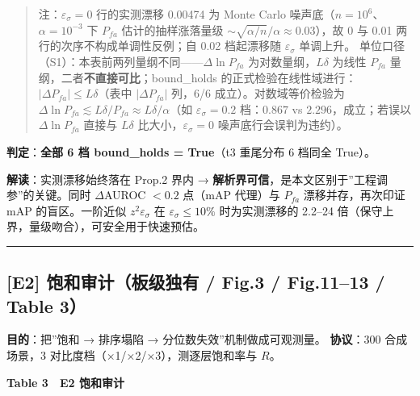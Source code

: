 \begin{quote}
注：\(\varepsilon_\sigma=0\) 行的实测漂移 0.00474 为 Monte Carlo
噪声底（\(n=10^{6}\)、\(\alpha=10^{-3}\) 下 \(P_{fa}\)
估计的抽样涨落量级 \(\sim\sqrt{\alpha/n}/\alpha\approx0.03\)），故 0 与
0.01 两行的次序不构成单调性反例；自 0.02 档起漂移随
\(\varepsilon_\sigma\) 单调上升。
单位口径（S1）：本表前两列量纲不同------\(\Delta\ln P_{fa}\)
为对数量纲，\(L\delta\) 为线性 \(P_{fa}\)
量纲，二者\textbf{不直接可比}；bound\_holds
的正式检验在线性域进行：\(|\Delta P_{fa}|\le L\delta\)（表中
\(|\Delta P_{fa}|\) 列，6/6 成立）。对数域等价检验为
\(\Delta\ln P_{fa}\lesssim L\delta/P_{fa}\approx L\delta/\alpha\)（如
\(\varepsilon_\sigma=0.2\) 档：\(0.867\) vs \(2.296\)，成立；若误以
\(\Delta\ln P_{fa}\) 直接与 \(L\delta\) 比大小，\(\varepsilon_\sigma=0\)
噪声底行会误判为违约）。
\end{quote}

\textbf{判定}：\textbf{全部 6 档 bound\_holds = True}（t3 重尾分布 6
档同全 True）。

\textbf{解读}：实测漂移始终落在 Prop.2 界内 →
\textbf{解析界可信}，是本文区别于''工程调参''的关键。同时
\(\Delta\)AUROC \(<0.2\) 点（mAP 代理）与 \(P_{fa}\) 漂移并存，再次印证
mAP 的盲区。一阶近似 \(z^2\varepsilon_\sigma\) 在
\(\varepsilon_\sigma\le10\%\) 时为实测漂移的 2.2--24
倍（保守上界，量级吻合），可安全用于快速预估。

\begin{center}\rule{0.5\linewidth}{0.5pt}\end{center}

\subsection{{[}E2{]} 饱和审计（板级独有 / Fig.3 / Fig.11--13 / Table
3）}\label{e2-ux9971ux548cux5ba1ux8ba1ux677fux7ea7ux72ecux6709-fig.3-fig.1113-table-3}

\textbf{目的}：把''饱和 → 排序塌陷 → 分位数失效''机制做成可观测量。
\textbf{协议}：300 合成场景，3 对比度档（×1/×2/×3），测逐层饱和率与
\(R\)。

\textbf{Table 3　E2 饱和审计}

